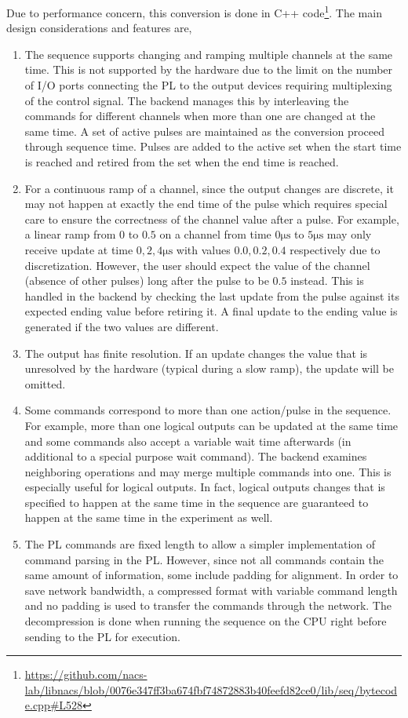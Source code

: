 Due to performance concern, this conversion is done in C++ code\footnote{\url{https://github.com/nacs-lab/libnacs/blob/0076e347ff3ba674fbf74872883b40feefd82ce0/lib/seq/bytecode.cpp\#L528}}.
The main design considerations and features are,
\begin{enumerate}
\item The sequence supports changing and ramping multiple channels at the same time.
  This is not supported by the hardware due to the limit on the number of I/O ports
  connecting the PL to the output devices requiring multiplexing of the control signal.
  The backend manages this by interleaving the commands for different channels
  when more than one are changed at the same time.
  A set of active pulses are maintained as the conversion proceed through sequence time.
  Pulses are added to the active set when the start time is reached
  and retired from the set when the end time is reached.
\item For a continuous ramp of a channel, since the output changes are discrete,
  it may not happen at exactly the end time of the pulse
  which requires special care to ensure the correctness of the channel value after a pulse.
  For example, a linear ramp from $0$ to $0.5$ on a channel from time $0 \mathrm{\mu s}$
  to $5 \mathrm{\mu s}$ may only receive update at time $0, 2, 4 \mathrm{\mu s}$
  with values $0.0, 0.2, 0.4$ respectively due to discretization.
  However, the user should expect the value of the channel (absence of other pulses)
  long after the pulse to be $0.5$ instead.
  This is handled in the backend by checking the last update from the pulse
  against its expected ending value before retiring it.
  A final update to the ending value is generated if the two values are different.
\item The output has finite resolution.
  If an update changes the value that is unresolved by the hardware
  (typical during a slow ramp), the update will be omitted.
\item Some commands correspond to more than one action/pulse in the sequence.
  For example, more than one logical outputs can be updated at the same time
  and some commands also accept a variable wait time afterwards
  (in additional to a special purpose wait command).
  The backend examines neighboring operations and may merge multiple commands into one.
  This is especially useful for logical outputs.
  In fact, logical outputs changes that is specified to happen at the same time in the sequence
  are guaranteed to happen at the same time in the experiment as well.
\item The PL commands are fixed length to allow a simpler implementation
  of command parsing in the PL.
  However, since not all commands contain the same amount of information,
  some include padding for alignment.
  In order to save network bandwidth, a compressed format with variable command length
  and no padding is used to transfer the commands through the network.
  The decompression is done when running the sequence on the CPU right before
  sending to the PL for execution.
\end{enumerate}


